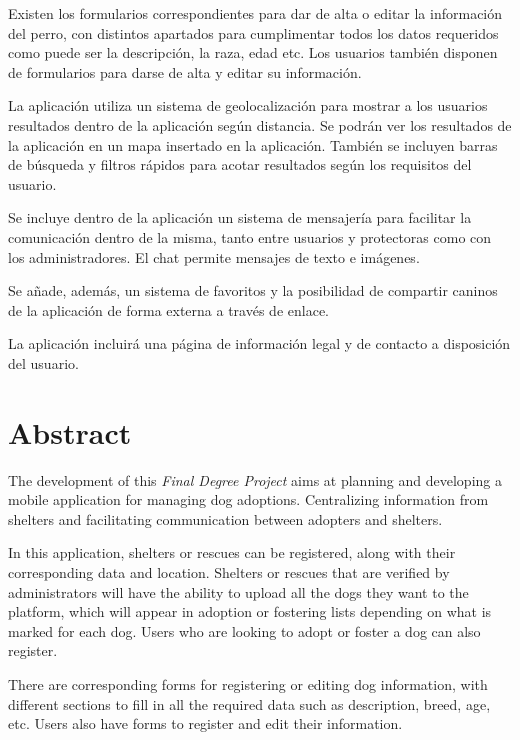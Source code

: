 \documentclass[a4paper, 12pt]{article}
\begin{document}
Existen los formularios correspondientes para dar de alta o editar la información del perro, con distintos apartados para cumplimentar todos los datos requeridos como puede ser la descripción, la raza, edad etc. Los usuarios también disponen de formularios para darse de alta y editar su información.

La aplicación utiliza un sistema de geolocalización para mostrar a los usuarios resultados dentro de la aplicación según distancia. Se podrán ver los resultados de la aplicación en un mapa insertado en la aplicación. También se incluyen barras de búsqueda y filtros rápidos para acotar resultados según los requisitos del usuario.

Se incluye dentro de la aplicación un sistema de mensajería para facilitar la comunicación dentro de la misma, tanto entre usuarios y protectoras como con los administradores. El chat permite mensajes de texto e imágenes.

Se añade, además, un sistema de favoritos y la posibilidad de compartir caninos de la aplicación de forma externa a través de enlace. 

La aplicación incluirá una página de información legal y de contacto a disposición del usuario.


\newpage
\pagestyle{plain}
\thispagestyle{empty}
\mbox{}

\newpage
\pagestyle{plain}
\section*{Abstract}
The development of this \textit{Final Degree Project} aims at planning and developing a mobile application for managing dog adoptions. Centralizing information from shelters and facilitating communication between adopters and shelters.

In this application, shelters or rescues can be registered, along with their corresponding data and location. Shelters or rescues that are verified by administrators will have the ability to upload all the dogs they want to the platform, which will appear in adoption or fostering lists depending on what is marked for each dog. Users who are looking to adopt or foster a dog can also register.

There are corresponding forms for registering or editing dog information, with different sections to fill in all the required data such as description, breed, age, etc. Users also have forms to register and edit their information.
\end{document}
